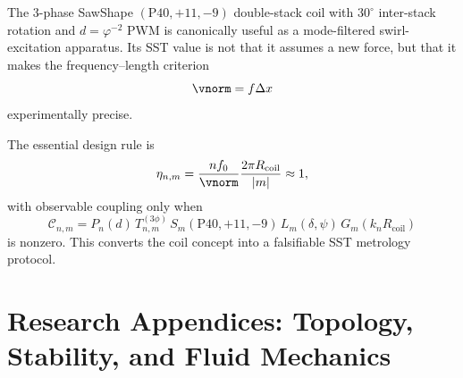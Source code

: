 The 3-phase SawShape $(\mathrm{P40},+11,-9)$ double-stack coil with $30^\circ$ inter-stack rotation and $d=\varphi^{-2}$ PWM is canonically useful as a mode-filtered swirl-excitation apparatus. Its SST value is not that it assumes a new force, but that it makes the frequency--length criterion
\[
\vnorm=f\Delta x
\]
experimentally precise.

The essential design rule is
\[
\eta_{n,m}
=
\frac{n f_0}{\vnorm}
\frac{2\pi R_{\mathrm{coil}}}{|m|}
\approx 1,
\]
with observable coupling only when
\[
\mathcal{C}_{n,m}
=
P_n(d)\,
T_{n,m}^{(3\phi)}\,
S_m(\mathrm{P40},+11,-9)\,
L_m(\delta,\psi)\,
G_m(k_nR_{\mathrm{coil}})
\]
is nonzero. This converts the coil concept into a falsifiable SST metrology protocol.

%
%
%
%
%



\section{Research Appendices: Topology, Stability, and Fluid Mechanics}

